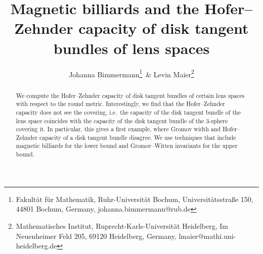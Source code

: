 \documentclass[12pt]{article}
\begin{document}
\title{Magnetic billiards and the Hofer--Zehnder capacity of disk tangent bundles of lens spaces}
 
\author{{Johanna Bimmermann\footnote{Fakultät für Mathematik, Ruhr-Universität Bochum, Universitätsstraße 150, 44801 Bochum, Germany, johanna.bimmermann@rub.de}\ \& Levin Maier\footnote{Mathematisches Institut, Ruprecht-Karls-Universität Heidelberg, Im Neuenheimer Feld 205, 69120 Heidelberg, Germany, lmaier@mathi.uni-heidelberg.de} }}

\maketitle

\begin{abstract}
\noindent
We compute the Hofer--Zehnder capacity of disk tangent bundles of certain lens spaces with respect to the round metric. Interestingly, we find that the Hofer--Zehnder capacity does not see the covering, i.e.\ the capacity of the disk tangent bundle of the lens space coincides with the capacity of the disk tangent bundle of the 3-sphere covering it. In particular, this gives a first example, where Gromov width and Hofer--Zehnder capacity of a disk tangent bundle disagree. We use techniques that include magnetic billiards for the lower bound and Gromov--Witten invariants for the upper bound.
\end{abstract}
\end{document}
